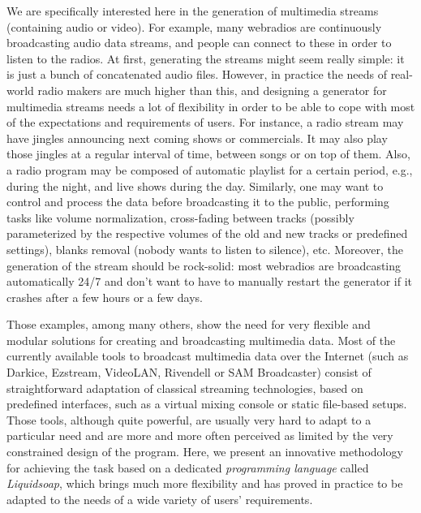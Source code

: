 \documentclass{llncs}
\newcommand{\eg}{{e.g.,}}
\newcommand{\TODO}[1]{\marginpar{\tiny #1}}
\begin{document}
We are specifically interested here in the generation of multimedia streams
(containing audio or video). For example, many webradios are continuously
broadcasting audio data streams, and people can connect to these in order to
listen to the radios. At first, generating the streams might seem really simple:
it is just a bunch of concatenated audio files. However, in practice the needs
of real-world radio makers are much higher than this, and designing a generator
for multimedia streams needs a lot of flexibility in order to be able to cope
with most of the expectations and requirements of users. For instance, a radio
stream may have jingles announcing next coming shows or commercials. It may also
play those jingles at a regular interval of time, between songs or on top of
them. Also, a radio program may be composed of automatic playlist for a certain
period, \eg{} during the night, and live shows during the day. Similarly, one
may want to control and process the data before broadcasting it to the public,
performing tasks like volume normalization, cross-fading between tracks
(possibly parameterized by the respective volumes of the old and new tracks or
predefined settings), blanks removal (nobody wants to listen to silence),
etc. Moreover, the generation of the stream should be rock-solid: most webradios
are broadcasting automatically 24/7 and don't want to have to manually restart
the generator if it crashes after a few hours or a few days.

Those examples, among many others, show the need for very flexible and modular
solutions for creating and broadcasting multimedia data. Most of the currently
available tools to broadcast multimedia data over the Internet (such as Darkice,
Ezstream, VideoLAN, Rivendell or SAM Broadcaster) consist of straightforward
adaptation of classical streaming technologies, based on
predefined interfaces, such as a virtual mixing console or static file-based
setups. Those tools, although quite powerful, are usually very hard to adapt to
a particular need and are more and more often perceived as limited by the very
\TODO{DB "new" c'est abusé}
\TODO{RB c ok avec innovative ?}
constrained design of the program. Here, we present an innovative methodology for
achieving the task based on a dedicated \emph{programming language} called
\emph{Liquidsoap}, which brings much more flexibility and has proved in practice
to be adapted to the needs of a wide variety of users' requirements.
\end{document}
